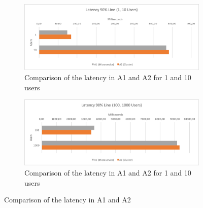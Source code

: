 \documentclass[a4paper,oneside]{bth}
\begin{document}
\begin{figure}[h]
\begin{center}

\begin{subfigure}[b]{1\textwidth}
\includegraphics[width=12cm]{Graph/rq3-latency-1}
\caption{Comparison of the latency in A1 and A2 for 1 and 10 users}
\end{subfigure}

\begin{subfigure}[b]{1\textwidth}
\includegraphics[width=12cm]{Graph/rq3-latency-2}
\caption{Comparison of the latency in A1 and A2 for 1 and 10 users}
\end{subfigure}

\caption{Comparison of the latency in A1 and A2}
\label{rq3-latency}

\end{center}
\end{figure}
\end{document}
